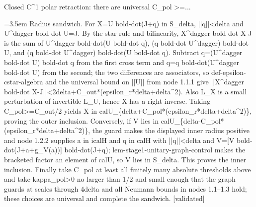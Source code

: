 \documentclass{article}
\newcommand{\step}[1]{\par\noindent\hangindent=3.5em\hangafter=1%
  \makebox[3.5em][l]{\textbf{#1.}}}
\newcommand{\steptag}[1]{\hfill{\small\textsf{[#1]}}}
\begin{document}
\begin{proofbox}{Closed C\textasciicircum{}1 polar retraction: there are universal C\_pol >=...}
\step{1.4.1} Radius sandwich. For X=U bold-dot(J+q) in S\_delta, ||q||<delta and U\textasciicircum{}dagger bold-dot U=J. By the star rule and bilinearity, X\textasciicircum{}dagger bold-dot X-J is the sum of U\textasciicircum{}dagger bold-dot(U bold-dot q), (q bold-dot U\textasciicircum{}dagger) bold-dot U, and (q bold-dot U\textasciicircum{}dagger) bold-dot(U bold-dot q). Subtract q=(U\textasciicircum{}dagger bold-dot U) bold-dot q from the first cross term and q=q bold-dot(U\textasciicircum{}dagger bold-dot U) from the second; the two differences are associators, so def-epsilon-cstar-algebra and the universal bound on ||U|| from node 1.1.1 give ||X\textasciicircum{}dagger bold-dot X-J||<2delta+C\_out*(epsilon\_r*delta+delta\textasciicircum{}2). Also L\_X is a small perturbation of invertible L\_U, hence X has a right inverse. Taking C\_pol>=C\_out/2 yields X in calU\_\{delta+C\_pol*(epsilon\_r*delta+delta\textasciicircum{}2)\}, proving the outer inclusion. Conversely, if V lies in calU\_\{delta-C\_pol*(epsilon\_r*delta+delta\textasciicircum{}2)\}, the guard makes the displayed inner radius positive and node 1.2.2 supplies a in icalH and q in calH with ||q||<delta and V=[V bold-dot(J+a+g\_V(a))] bold-dot(J+q); lem-stage1-unitary-graph-control makes the bracketed factor an element of calU, so V lies in S\_delta. This proves the inner inclusion. Finally take C\_pol at least all finitely many absolute thresholds above and take kappa\_pol>0 no larger than 1/2 and small enough that the graph guards at scales through 4delta and all Neumann bounds in nodes 1.1--1.3 hold; these choices are universal and complete the sandwich. \steptag{validated} \\[6pt]

\end{proofbox}
\end{document}

